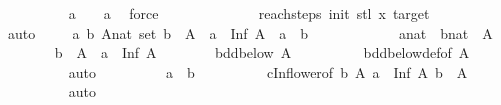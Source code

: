 \begin{isabellebody}
\ \ \ \ \ \ \ \ \isamarkupfalse%
\ {\isacartoucheopen}a{\isacharprime}{\kern0pt}\ {\isacharplus}{\kern0pt}\ {}\ {\isacharequal}{\kern0pt}\ a{\isacartoucheclose}\ \isamarkupfalse%
\ force\isanewline
\ \ \ \ \isamarkupfalse%
\ \isanewline
\ \ \ \ \isamarkupfalse%
\ \isamarkupfalse%
\ {\isachardoublequoteopen}reach{\isacharunderscore}{\kern0pt}steps\ init{\isacharprime}{\kern0pt}\ {\isacharparenleft}{\kern0pt}stl\ x{\isacharparenright}{\kern0pt}\ target\ {\isasymnoteq}\ {\isacharbraceleft}{\kern0pt}{\isacharbraceright}{\kern0pt}{\isachardoublequoteclose}\isanewline
\ \ \ \ \ \ \isamarkupfalse%
\ auto\isanewline
\ \ \ \ \isamarkupfalse%
{\isachardoublequoteopen}{\isasymAnd}a\ b\ A{\isacharcolon}{\kern0pt}{\isacharcolon}{\kern0pt}nat\ set{\isachardot}{\kern0pt}\ b\ {\isasymin}\ A\ {\isasymLongrightarrow}\ a\ {\isacharequal}{\kern0pt}\ Inf\ A\ {\isasymLongrightarrow}\ a\ {\isasymle}\ b{\isachardoublequoteclose}\isanewline
\ \ \ \ \isamarkupfalse%
{\isacharminus}{\kern0pt}\isanewline
\ \ \ \ \ \ \isamarkupfalse%
\ a{\isacharcolon}{\kern0pt}{\isacharcolon}{\kern0pt}nat\ \ b{\isacharcolon}{\kern0pt}{\isacharcolon}{\kern0pt}nat\ \ A\isanewline
\ \ \ \ \ \ \isamarkupfalse%
\ {\isachardoublequoteopen}b\ {\isasymin}\ A{\isachardoublequoteclose}\ \ {\isachardoublequoteopen}a\ {\isacharequal}{\kern0pt}\ Inf\ A{\isachardoublequoteclose}\isanewline
\ \ \ \ \ \ \isamarkupfalse%
\ {\isachardoublequoteopen}bdd{\isacharunderscore}{\kern0pt}below\ A{\isachardoublequoteclose}\isanewline
\ \ \ \ \ \ \ \ \isamarkupfalse%
\ bdd{\isacharunderscore}{\kern0pt}below{\isacharunderscore}{\kern0pt}def{\isacharbrackleft}{\kern0pt}of\ A{\isacharbrackright}{\kern0pt}\isanewline
\ \ \ \ \ \ \ \ \isamarkupfalse%
\ auto\isanewline
\ \ \ \ \ \ \isamarkupfalse%
\ \isamarkupfalse%
\ {\isachardoublequoteopen}a\ {\isasymle}\ b{\isachardoublequoteclose}\isanewline
\ \ \ \ \ \ \ \ \isamarkupfalse%
\ cInf{\isacharunderscore}{\kern0pt}lower{\isacharbrackleft}{\kern0pt}of\ b\ A{\isacharbrackright}{\kern0pt}\ {\isacartoucheopen}a\ {\isacharequal}{\kern0pt}\ Inf\ A{\isacartoucheclose}\ {\isacartoucheopen}b\ {\isasymin}\ A{\isacartoucheclose}\isanewline
\ \ \ \ \ \ \ \ \isamarkupfalse%
\ auto\isanewline
\ \ \ \ \ \ \isamarkupfalse%
\isanewline
\ \ \ \ \isamarkupfalse%

\end{isabellebody}
